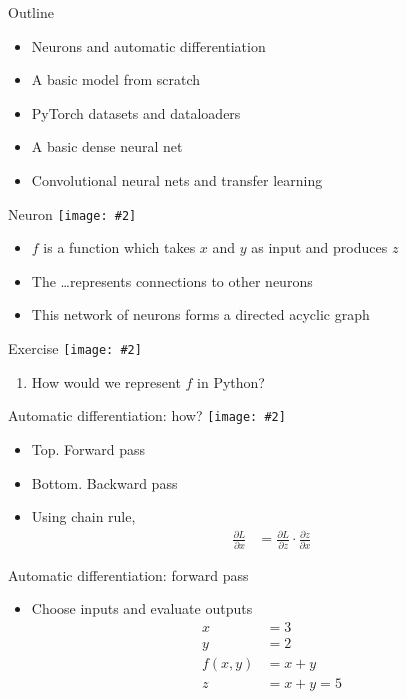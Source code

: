 \documentclass[hyperref={pdfpagelabels=false},12pt]{beamer}
\newcommand{\ig}[2]{\texttt{[image: \#2]}}
\begin{document}
\begin{frame}{Outline}
  \begin{itemize}
    \item Neurons and automatic differentiation
    \item A basic model from scratch
    \item PyTorch datasets and dataloaders
    \item A basic dense neural net
    \item Convolutional neural nets and transfer learning
  \end{itemize}
\end{frame}

\begin{frame}{Neuron}
  \centering
  \ig{0.75}{figures/neuron.png}
  \begin{itemize}
      \item $f$ is a function which takes $x$ and $y$ as input and produces $z$
      \item The \dots represents connections to other neurons
      \item This network of neurons forms a directed acyclic graph
  \end{itemize}
\end{frame}

\begin{frame}{Exercise}
  \centering
  \ig{0.75}{figures/neuron.png}
  \begin{enumerate}
    \item How would we represent $f$ in Python?
  \end{enumerate}
\end{frame}

\begin{frame}{Automatic differentiation: how?}
  \centering
  \ig{0.5}{figures/autograd.png}
  \begin{itemize}
      \item Top. Forward pass
      \item Bottom. Backward pass
      \item Using chain rule,
        \begin{align*}
          \frac{\partial L}{\partial x} &= \frac{\partial L}{\partial z} \cdot
                    \frac{\partial z}{\partial x}
        \end{align*}
  \end{itemize}
\end{frame}

\begin{frame}{Automatic differentiation: forward pass}
  \begin{itemize}
    \item Choose inputs and evaluate outputs
      \begin{align*}
        x &= 3 \\
        y &= 2 \\
        f(x, y) &= x + y \\
        z &= x + y = 5
      \end{align*}
  \end{itemize}
\end{frame}
\end{document}
